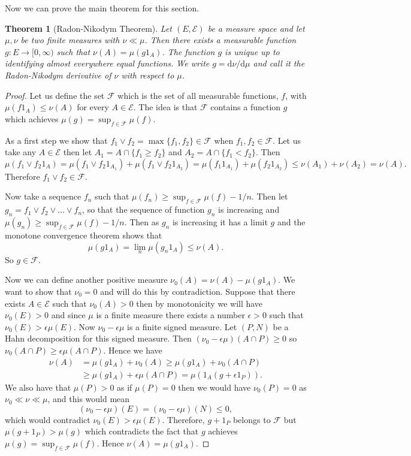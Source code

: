 \documentclass[11pt]{article}
\newtheorem{thm}{Theorem}[section]
\theoremstyle{definition}
\theoremstyle{remark}
\begin{document}
Now we can prove the main theorem for this section.
\begin{thm}[Radon-Nikodym Theorem]
Let $(E, \mathcal{E})$ be a measure space and let $\mu, \nu$ be two finite measures with $\nu \ll \mu$. Then there exists a measurable function $g: E \rightarrow [0, \infty)$ such that $\nu(A) = \mu(g1_A)$. The function $g$ is unique up to identifying almost everywhere equal functions. We write $g = \mathrm{d}\nu/\mathrm{d}\mu$ and call it the Radon-Nikodym derivative of $\nu$ with respect to $\mu$.
\end{thm}
\begin{proof}
Let us define the set $\mathcal{F}$ which is the set of all measurable functions, $f$, with $\mu(f1_A) \leq \nu(A)$ for every $A \in \mathcal{E}$. The idea is that $\mathcal{F}$ contains a function $g$ which achieves $\mu(g) = \sup_{f \in \mathcal{F}} \mu(f)$.

As a first step we show that $f_1 \vee f_2 = \max\{ f_1, f_2\} \in \mathcal{F}$ when $f_1, f_2 \in \mathcal{F}$. Let us take any $A \in \mathcal{E}$ then let $A_1 = A \cap \{ f_1 \geq f_2\}$ and $A_2 = A \cap \{ f_1 < f_2\}$. Then 
\[ \mu(f_1 \vee f_2 1_A) = \mu(f_1 \vee f_2 1_{A_1}) + \mu(f_1 \vee f_2 1_{A_2}) = \mu(f_1 1_{A_1}) + \mu(f_2 1_{A_2}) \leq \nu(A_1) + \nu(A_2) = \nu(A).  \] Therefore $f_1 \vee f_2 \in \mathcal{F}$.

Now take a sequence $f_n$ such that $\mu(f_n) \geq \sup_{f \in \mathcal{F}} \mu(f) - 1/n$. Then let $g_n = f_1 \vee f_2 \vee \dots \vee f_n$, so that the sequence of function $g_n$ is increasing and $\mu(g_n) \geq \sup_{f \in \mathcal{F}} \mu(f) - 1/n$.  Then as $g_n$ is increasing it has a limit $g$ and the monotone convergence theorem shows that 
\[ \mu(g1_A) = \lim_n \mu(g_n1_A) \leq \nu(A). \] So $g \in \mathcal{F}$. 

Now we can define another positive measure $\nu_0(A) = \nu(A) - \mu(g1_A)$. We want to show that $\nu_0 =0$ and will do this by contradiction. Suppose that there exists $A \in \mathcal{E}$ such that $\nu_0(A)>0$ then by monotonicity we will have $\nu_0(E) >0$ and since $\mu$ is a finite measure there exists a number $\epsilon >0$ such that $\nu_0(E) > \epsilon \mu(E)$. Now $\nu_0 - \epsilon \mu$ is a finite signed measure. Let $(P, N)$ be a Hahn decomposition for this signed measure. Then $(\nu_0 - \epsilon \mu)(A \cap P) \geq 0$ so $\nu_0(A\cap P) \geq \epsilon \mu(A \cap P)$. Hence we have
\begin{align*}
\nu(A) &= \mu(g1_A) + \nu_0(A) \geq \mu(g1_A) + \nu_0(A \cap P) \\
& \geq \mu(g1_A) + \epsilon \mu(A \cap P) = \mu(1_A(g +\epsilon 1_{P})).
\end{align*}
We also have that $\mu(P) >0$ as if $\mu(P) = 0$ then we would have $\nu_0(P)=0$ as $\nu_0 \ll \nu \ll \mu$, and this would mean \[ (\nu_0 - \epsilon \mu)(E) = (\nu_0 - \epsilon \mu)(N) \leq 0, \] which would contradict $\nu_0(E) > \epsilon \mu(E)$. Therefore, $g+ 1_P$ belongs to $\mathcal{F}$ but $\mu(g+1_P) > \mu(g)$ which contradicts the fact that $g$ achieves $\mu(g) = \sup_{f \in \mathcal{F}} \mu(f)$. Hence $\nu(A) = \mu(g1_A)$. 


\end{proof}
\end{document}
